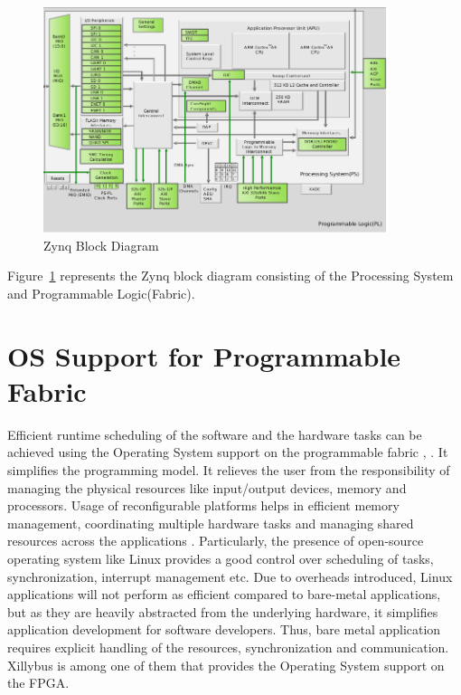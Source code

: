 \begin{figure}
	\centering
	\includegraphics[width=0.9\textwidth]{images/zynqblockdiagram.png}
	\caption{Zynq Block Diagram\cite{12}}
	\label{zynq:blk}
\end{figure}


Figure~\ref{zynq:blk} represents the Zynq block diagram consisting of the Processing System and Programmable Logic(Fabric).

\section{OS Support for Programmable Fabric}
Efficient runtime scheduling of the software and the hardware tasks can be achieved using the Operating System support on the programmable fabric \cite{13}, \cite{14}. It simplifies the programming model. It relieves the user from the responsibility of managing the physical resources like input/output devices, memory and processors. Usage of reconfigurable platforms helps in efficient memory management, coordinating multiple hardware tasks and managing shared resources across the applications \cite{15}. Particularly, the presence of open-source operating system like Linux provides a good control over scheduling of tasks, synchronization, interrupt management etc. Due to overheads introduced, Linux applications will not perform as efficient compared to bare-metal applications, but as they are heavily abstracted from the underlying hardware, it simplifies application development for software developers. Thus, bare metal application requires explicit handling of the resources, synchronization and communication. Xillybus \cite{16} is among one of them that provides the Operating System support on the FPGA.

